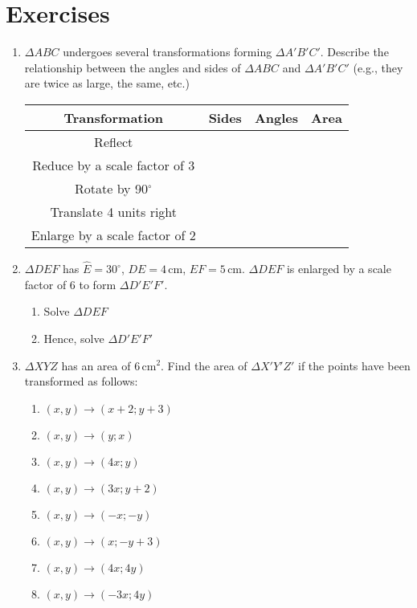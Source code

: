 \section{Exercises}
\begin{enumerate}
\item $\Delta ABC$ undergoes several transformations forming $\Delta A' B' C'$. Describe the relationship between the angles and sides of $\Delta ABC$ and $\Delta A' B' C'$ (e.g., they are twice as large, the same, etc.)

\begin{tabular}{|c|c|c|c|}
\hline
Transformation & Sides & Angles & Area \\
\hline
Reflect & & & \\
\hline
Reduce by a scale factor of 3 & & & \\
\hline
Rotate by 90$^\circ$ & & & \\
\hline
Translate 4 units right & & & \\
\hline
Enlarge by a scale factor of 2 & & & \\
\hline
\end{tabular}

\item $\Delta DEF$ has $\hat{E} = 30^\circ$, $DE = 4\,\mbox{cm}$, $EF = 5\,\mbox{cm}$. $\Delta DEF$ is enlarged by a scale factor of 6 to form $\Delta D'E'F'$.
\begin{enumerate}
\item Solve $\Delta DEF$
\item Hence, solve $\Delta D'E'F'$
\end{enumerate}

\item $\Delta XYZ$ has an area of $6\,\mbox{cm}^2$. Find the area of $\Delta X'Y'Z'$ if the points have been transformed as follows:
\begin{enumerate}
\newcommand{\tf}[1]{\item $(x, y)\rightarrow(#1)$}
\tf{x+2; y+3}
\tf{y; x}
\tf{4x; y}
\tf{3x; y+2}
\tf{-x; -y}
\tf{x; -y+3}
\tf{4x; 4y}
\tf{-3x; 4y}
\end{enumerate}

\end{enumerate}






